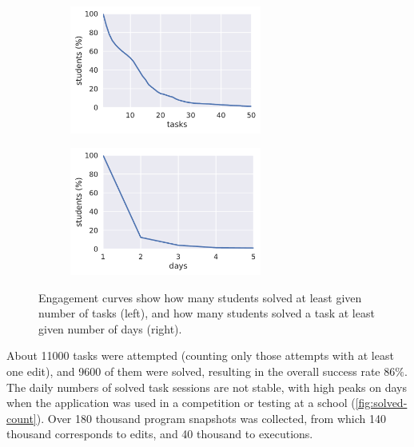 \begin{figure}[htb]
\centering
\begin{subfigure}{.49\textwidth}
\centering
\includegraphics[height=42mm]{img/engagement-tasks}
\end{subfigure}
\begin{subfigure}{.49\textwidth}
\centering
\includegraphics[height=42mm]{img/engagement-days}
\end{subfigure}
\caption{%
  Engagement curves show how many students solved at least given number of tasks (left),
  and how many students solved a task at least given number of days (right).}
\label{fig:engagement-curves}
\end{figure}


About 11000 tasks were attempted (counting only those attempts with at least one edit),
and 9600 of them were solved,
resulting in the overall success rate $86\%$.
The daily numbers of solved task sessions are not stable,
with high peaks on days when the application was used
in a competition or testing at a school
(\cref{fig:solved-count}).
Over 180 thousand program snapshots was collected,
from which 140 thousand corresponds to edits,
and 40 thousand to executions.

